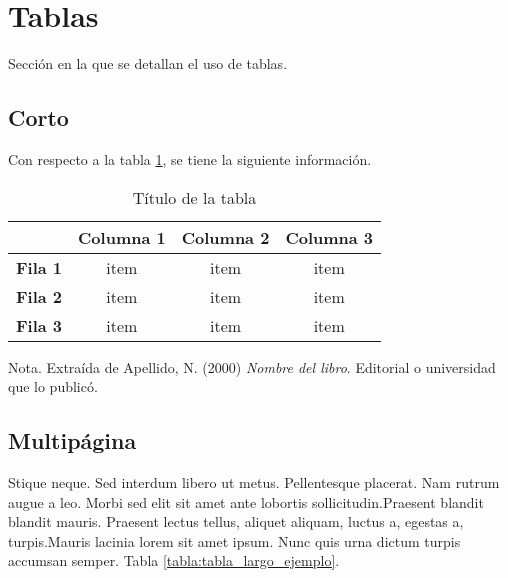 \section{Tablas}
Sección en la que se detallan el uso de tablas.

\subsection{Corto}
Con respecto a la tabla \ref{tabla:ejemplo}, se tiene la siguiente 
información.

\begin{table}[!h]
    \begin{center}
        \caption{Título de la tabla}
        \label{tabla:ejemplo}
        \begin{tabular}{c|c|c|c|}
            \cline{2-4}
            & \textbf{Columna 1} & \textbf{Columna 2} & \textbf{Columna 3} \\ \hline
            \multicolumn{1}{|c|}{\textbf{Fila 1}} & item               & item               & item               \\ \hline
            \multicolumn{1}{|c|}{\textbf{Fila 2}} & item               & item               & item               \\ \hline
            \multicolumn{1}{|c|}{\textbf{Fila 3}} & item               & item               & item               \\ \hline
        \end{tabular}
    \end{center}
    \vspace{4mm}
    Nota. Extraída de Apellido, N. (2000) \textit{Nombre del libro}.
    Editorial o universidad que lo publicó.
\end{table}

\subsection{Multipágina}
Stique neque. Sed interdum libero ut metus.
Pellentesque placerat. Nam rutrum augue a leo. Morbi sed 
elit sit amet ante lobortis sollicitudin.Praesent blandit 
blandit mauris. Praesent lectus tellus, aliquet aliquam,
luctus a, egestas a, turpis.Mauris lacinia lorem sit amet
ipsum. Nunc quis urna dictum turpis accumsan semper. Tabla
\ref{tabla:tabla_largo_ejemplo}.

